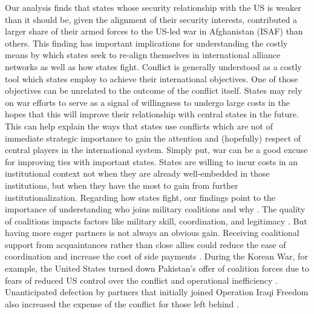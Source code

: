 \documentclass[12pt,letterpaper]{article}
\begin{document}
	Our analysis finds that states whose security relationship with the US is weaker than it should be, given the alignment of their security interests, contributed a larger share of their armed forces to the US-led war in Afghanistan (ISAF) than others. This finding has important implications for understanding the costly means by which states seek to re-align themselves in international alliance networks as well as how states fight. Conflict is generally understood as a costly tool which states employ to achieve their international objectives. One of those objectives can be unrelated to the outcome of the conflict itself. States may rely on war efforts to serve as a signal of willingness to undergo large costs in the hopes that this will improve their relationship with central states in the future. This can help explain the ways that states use conflicts which are not of immediate strategic importance to gain the attention and (hopefully) respect of central players in the international system. Simply put, war can be a good excuse for improving ties with important states. States are willing to incur costs in an institutional context not when they are already well-embedded in those institutions, but when they have the most to gain from further institutionalization. Regarding how states fight, our findings point to the importance of understanding who joins military coalitions and why \citep[12-14]{wolford_politicsmilitarycoalitions_2015}. The quality of coalitions impacts factors like military skill, coordination, and legitimacy \citep{auerswald_natoafghanistanfighting_2014, saideman_ambivalentcoalitiondoing_2016, cranmer_coalitionqualitymultinational_2017, cappellazielinski_dictatorsfightingtogether_2018}. But having more eager partners is not always an obvious gain. Receiving coalitional support from acquaintances rather than close allies could reduce the ease of coordination and increase the cost of side payments \citep{papayoanou_intraalliancebargainingbosnia_1997, morrow_alliancesasymmetryalternative_1991, wolford_politicsmilitarycoalitions_2015}. During the Korean War, for example, the United States turned down Pakistan's offer of coalition forces due to fears of reduced US control over the conflict and operational inefficiency \citep{stueck_koreanwarinternational_1997}. Unanticipated defection by partners that initially joined Operation Iraqi Freedom also increased the expense of the conflict for those left behind \citep[12-13]{mcinnis_varietiesdefectionstrategies_2018}.
\end{document}
